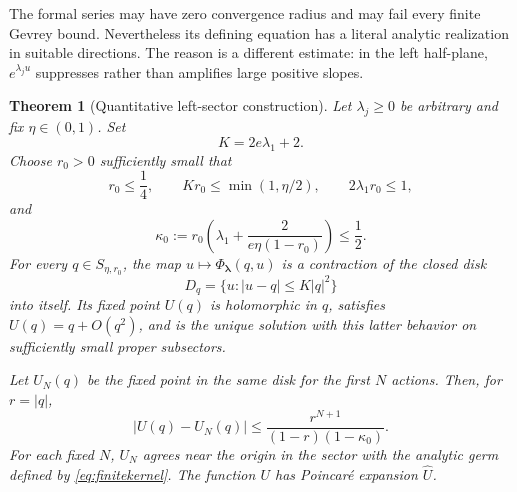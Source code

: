 \documentclass[11pt,a4paper]{article}
\numberwithin{equation}{section}
\newtheorem{theorem}{Theorem}[section]
\theoremstyle{definition}
\theoremstyle{remark}
\newcommand{\lam}{\boldsymbol\lambda}
\newcommand{\PhiL}{\Phi_{\lam}}
\newcommand{\Uhat}{\widehat U}
\begin{document}
The formal series may have zero convergence radius and may fail every
finite Gevrey bound.  Nevertheless its defining equation has a literal
analytic realization in suitable directions.  The reason is a different
estimate: in the left half-plane, $e^{\lambda_j u}$ suppresses rather than
amplifies large positive slopes.

\begin{theorem}[Quantitative left-sector construction]
\label{thm:sector}
Let $\lambda_j\ge0$ be arbitrary and fix $\eta\in(0,1)$.  Set
\[
 K=2e\lambda_1+2.
\]
Choose $r_0>0$ sufficiently small that
\begin{equation}
 r_0\le\frac14,\qquad
 Kr_0\le\min(1,\eta/2),\qquad
 2\lambda_1r_0\le1,
 \label{eq:sectorradius1}
\end{equation}
and
\begin{equation}
 \kappa_0:=r_0\left(\lambda_1+
              \frac{2}{e\eta(1-r_0)}\right)\le\frac12.
 \label{eq:sectorradius2}
\end{equation}
For every $q\in S_{\eta,r_0}$, the map $u\mapsto\PhiL(q,u)$ is a
contraction of the closed disk
\[
 D_q=\{u:|u-q|\le K|q|^2\}
\]
into itself.  Its fixed point $U(q)$ is holomorphic in $q$, satisfies
$U(q)=q+O(q^2)$, and is the unique solution with this latter behavior on
sufficiently small proper subsectors.

Let $U_N(q)$ be the fixed point in the same disk for the first $N$ actions.
Then, for $r=|q|$,
\begin{equation}
 \boxed{\qquad
 |U(q)-U_N(q)|\le
 \frac{r^{N+1}}{(1-r)(1-\kappa_0)}.
 \qquad}
 \label{eq:sectorerror}
\end{equation}
For each fixed $N$, $U_N$ agrees near the origin in the sector with the
analytic germ defined by \eqref{eq:finitekernel}.  The function $U$ has
Poincar\'e expansion $\Uhat$.
\end{theorem}
\end{document}
